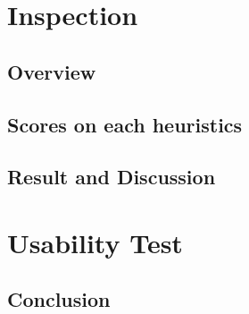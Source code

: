 \documentclass[fontsize=11pt,paper=a4,pagesize=auto]{report}
\begin{document}
\part{Inspection}

\chapter{Overview}
 

\chapter{Scores on each heuristics}



\chapter{Result and Discussion}



\part{Usability Test}


\chapter{Conclusion}

\end{document}
